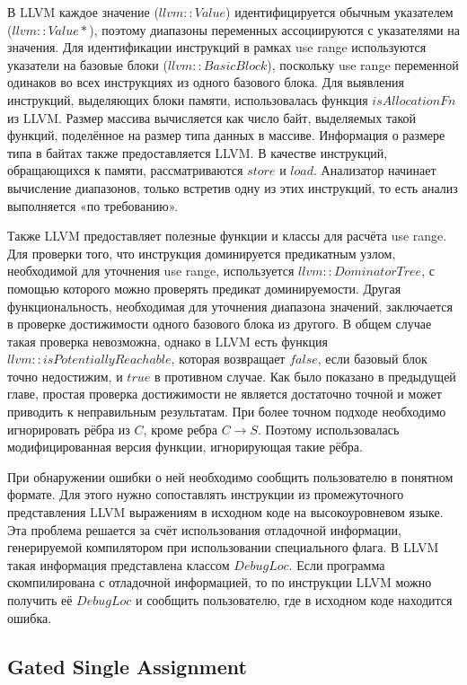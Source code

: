В LLVM каждое значение ($llvm::Value$) идентифицируется обычным
указателем ($llvm::Value *$), поэтому диапазоны переменных
ассоциируются с указателями на значения. Для идентификации инструкций
в рамках use range используются указатели на базовые блоки
($llvm::BasicBlock$), поскольку use range переменной одинаков во всех
инструкциях из одного базового блока. Для выявления инструкций,
выделяющих блоки памяти, использовалась функция $isAllocationFn$ из
LLVM. Размер массива вычисляется как число байт, выделяемых такой
функций, поделённое на размер типа данных в массиве. Информация о
размере типа в байтах также предоставляется LLVM. В качестве
инструкций, обращающихся к памяти, рассматриваются $store$ и
$load$. Анализатор начинает вычисление диапазонов, только встретив
одну из этих инструкций, то есть анализ выполняется «по требованию».

Также LLVM предоставляет полезные функции и классы для расчёта use
range. Для проверки того, что инструкция доминируется предикатным
узлом, необходимой для уточнения use range, используется
$llvm::DominatorTree$, с помощью которого можно проверять предикат
доминируемости. Другая функциональность, необходимая для уточнения
диапазона значений, заключается в проверке достижимости одного
базового блока из другого. В общем случае такая проверка невозможна,
однако в LLVM есть функция $llvm::isPotentiallyReachable$, которая
возвращает $false$, если базовый блок точно недостижим, и $true$ в
противном случае. Как было показано в предыдущей главе, простая
проверка достижимости не является достаточно точной и может приводить
к неправильным результатам. При более точном подходе необходимо
игнорировать рёбра из $C$, кроме ребра $C \rightarrow S$. Поэтому
использовалась модифицированная версия функции, игнорирующая такие
рёбра.

При обнаружении ошибки о ней необходимо сообщить пользователю в
понятном формате. Для этого нужно сопоставлять инструкции из
промежуточного представления LLVM выражениям в исходном коде на
высокоуровневом языке. Эта проблема решается за счёт использования
отладочной информации, генерируемой компилятором при использовании
специального флага. В LLVM такая информация представлена классом
$DebugLoc$. Если программа скомпилирована с отладочной информацией, то
по инструкции LLVM можно получить её $DebugLoc$ и сообщить
пользователю, где в исходном коде находится ошибка.

\subsection{Gated Single Assignment}

